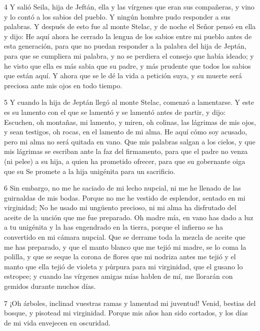 \par 4 Y salió Seila, hija de Jeftán, ella y las vírgenes que eran sus compañeras, y vino y lo contó a los sabios del pueblo. Y ningún hombre pudo responder a sus palabras. Y después de esto fue al monte Stelac, y de noche el Señor pensó en ella y dijo: He aquí ahora he cerrado la lengua de los sabios entre mi pueblo antes de esta generación, para que no puedan responder a la palabra del hija de Jeptán, para que se cumpliera mi palabra, y no se perdiera el consejo que había ideado; y he visto que ella es más sabia que su padre, y más prudente que todos los sabios que están aquí. Y ahora que se le dé la vida a petición suya, y su muerte será preciosa ante mis ojos en todo tiempo.

\par 5 Y cuando la hija de Jeptán llegó al monte Stelac, comenzó a lamentarse. Y este es su lamento con el que se lamentó y se lamentó antes de partir, y dijo: Escuchen, oh montañas, mi lamento, y miren, oh colinas, las lágrimas de mis ojos, y sean testigos, oh rocas, en el lamento de mi alma. He aquí cómo soy acusado, pero mi alma no será quitada en vano. Que mis palabras salgan a los cielos, y que mis lágrimas se escriban ante la faz del firmamento, para que el padre no venza (ni pelee) a su hija, a quien ha prometido ofrecer, para que su gobernante oiga que su Se promete a la hija unigénita para un sacrificio.

\par 6 Sin embargo, no me he saciado de mi lecho nupcial, ni me he llenado de las guirnaldas de mis bodas. Porque no me he vestido de esplendor, sentado en mi virginidad; No he usado mi ungüento precioso, ni mi alma ha disfrutado del aceite de la unción que me fue preparado. Oh madre mía, en vano has dado a luz a tu unigénita y la has engendrado en la tierra, porque el infierno se ha convertido en mi cámara nupcial. Que se derrame toda la mezcla de aceite que me has preparado, y que el manto blanco que me tejió mi madre, se lo coma la polilla, y que se seque la corona de flores que mi nodriza antes me tejió y el manto que ella tejió de violeta y púrpura para mi virginidad, que el gusano lo estropee; y cuando las vírgenes amigas mías hablen de mí, me llorarán con gemidos durante muchos días.

\par 7 ¡Oh árboles, inclinad vuestras ramas y lamentad mi juventud! Venid, bestias del bosque, y pisotead mi virginidad. Porque mis años han sido cortados, y los días de mi vida envejecen en oscuridad.

